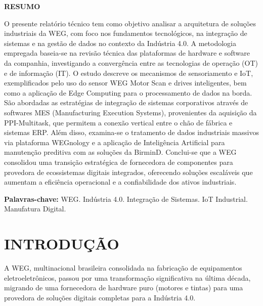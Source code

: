 \documentclass[12pt,a4paper,oneside]{abntex2}
\begin{document}
\imprimircapa

\imprimirfolhaderosto

\begin{resumo}
  \begin{center}
    \textbf{RESUMO}
  \end{center}

  O presente relatório técnico tem como objetivo analisar a arquitetura de soluções industriais da WEG, com foco nos fundamentos tecnológicos, na integração de sistemas e na gestão de dados no contexto da Indústria 4.0. A metodologia empregada baseia-se na revisão técnica das plataformas de hardware e software da companhia, investigando a convergência entre as tecnologias de operação (OT) e de informação (IT). O estudo descreve os mecanismos de sensoriamento e IoT, exemplificados pelo uso do sensor WEG Motor Scan e drives inteligentes, bem como a aplicação de Edge Computing para o processamento de dados na borda. São abordadas as estratégias de integração de sistemas corporativos através de softwares MES (Manufacturing Execution Systems), provenientes da aquisição da PPI-Multitask, que permitem a conexão vertical entre o chão de fábrica e sistemas ERP. Além disso, examina-se o tratamento de dados industriais massivos via plataforma WEGnology e a aplicação de Inteligência Artificial para manutenção preditiva com as soluções da BirminD. Conclui-se que a WEG consolidou uma transição estratégica de fornecedora de componentes para provedora de ecossistemas digitais integrados, oferecendo soluções escaláveis que aumentam a eficiência operacional e a confiabilidade dos ativos industriais.

  \vspace{1cm}
  \textbf{Palavras-chave:} WEG. Indústria 4.0. Integração de Sistemas. IoT Industrial. Manufatura Digital.
\end{resumo}

\newpage

\tableofcontents
\newpage

\chapter{INTRODUÇÃO}

A WEG, multinacional brasileira consolidada na fabricação de equipamentos eletroeletrônicos, passou por uma transformação significativa na última década, migrando de uma fornecedora de hardware puro (motores e tintas) para uma provedora de soluções digitais completas para a Indústria 4.0.
\end{document}
